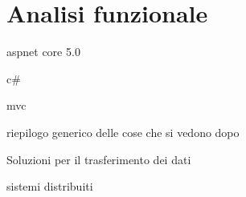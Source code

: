 \section{Analisi funzionale}
aspnet core 5.0 

c\#

mvc

riepilogo generico delle cose che si vedono dopo

Soluzioni per il trasferimento dei dati

sistemi distribuiti